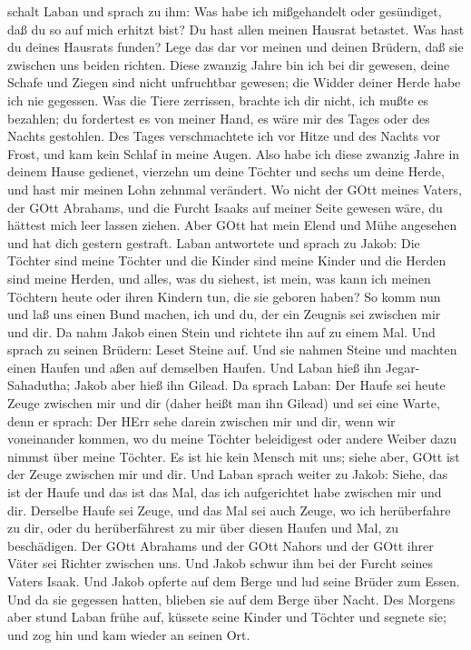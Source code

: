 schalt Laban und sprach zu ihm: Was habe ich mißgehandelt oder
gesündiget, daß du so auf mich erhitzt bist?  Du hast allen
meinen Hausrat betastet. Was hast du deines Hausrats funden? Lege das
dar vor meinen und deinen Brüdern, daß sie zwischen uns beiden richten.
 Diese zwanzig Jahre bin ich bei dir gewesen, deine Schafe
und Ziegen sind nicht unfruchtbar gewesen; die Widder deiner Herde habe
ich nie gegessen.  Was die Tiere zerrissen, brachte ich dir
nicht, ich mußte es bezahlen; du fordertest es von meiner Hand, es wäre
mir des Tages oder des Nachts gestohlen.  Des Tages
verschmachtete ich vor Hitze und des Nachts vor Frost, und kam kein
Schlaf in meine Augen.  Also habe ich diese zwanzig Jahre
in deinem Hause gedienet, vierzehn um deine Töchter und sechs um deine
Herde, und hast mir meinen Lohn zehnmal verändert.  Wo
nicht der GOtt meines Vaters, der GOtt Abrahams, und die Furcht Isaaks
auf meiner Seite gewesen wäre, du hättest mich leer lassen ziehen. Aber
GOtt hat mein Elend und Mühe angesehen und hat dich gestern gestraft.
 Laban antwortete und sprach zu Jakob: Die Töchter sind
meine Töchter und die Kinder sind meine Kinder und die Herden sind meine
Herden, und alles, was du siehest, ist mein, was kann ich meinen
Töchtern heute oder ihren Kindern tun, die sie geboren haben?
 So komm nun und laß uns einen Bund machen, ich und du, der
ein Zeugnis sei zwischen mir und dir.  Da nahm Jakob einen
Stein und richtete ihn auf zu einem Mal.  Und sprach zu
seinen Brüdern: Leset Steine auf. Und sie nahmen Steine und machten
einen Haufen und aßen auf demselben Haufen.  Und Laban hieß
ihn Jegar-Sahadutha; Jakob aber hieß ihn Gilead.  Da sprach
Laban: Der Haufe sei heute Zeuge zwischen mir und dir (daher heißt man
ihn Gilead)  und sei eine Warte, denn er sprach: Der HErr
sehe darein zwischen mir und dir, wenn wir voneinander kommen,
 wo du meine Töchter beleidigest oder andere Weiber dazu
nimmst über meine Töchter. Es ist hie kein Mensch mit uns; siehe aber,
GOtt ist der Zeuge zwischen mir und dir.  Und Laban sprach
weiter zu Jakob: Siehe, das ist der Haufe und das ist das Mal, das ich
aufgerichtet habe zwischen mir und dir.  Derselbe Haufe sei
Zeuge, und das Mal sei auch Zeuge, wo ich herüberfahre zu dir, oder du
herüberfährest zu mir über diesen Haufen und Mal, zu beschädigen.
 Der GOtt Abrahams und der GOtt Nahors und der GOtt ihrer
Väter sei Richter zwischen uns.  Und Jakob schwur ihm bei
der Furcht seines Vaters Isaak. Und Jakob opferte auf dem Berge und lud
seine Brüder zum Essen. Und da sie gegessen hatten, blieben sie auf dem
Berge über Nacht.  Des Morgens aber stund Laban frühe auf,
küssete seine Kinder und Töchter und segnete sie; und zog hin und kam
wieder an seinen Ort.

